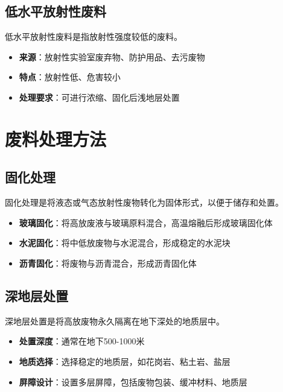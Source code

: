 \documentclass[12pt,UTF8]{ctexbook}
\begin{document}
\section{低水平放射性废料}

低水平放射性废料是指放射性强度较低的废料。

\begin{itemize}[leftmargin=2cm]
    \item \textbf{来源}：放射性实验室废弃物、防护用品、去污废物
    \item \textbf{特点}：放射性低、危害较小
    \item \textbf{处理要求}：可进行浓缩、固化后浅地层处置
\end{itemize}

\chapter{废料处理方法}

\section{固化处理}

固化处理是将液态或气态放射性废物转化为固体形式，以便于储存和处置。

\begin{itemize}[leftmargin=2cm]
    \item \textbf{玻璃固化}：将高放废液与玻璃原料混合，高温熔融后形成玻璃固化体
    \item \textbf{水泥固化}：将中低放废物与水泥混合，形成稳定的水泥块
    \item \textbf{沥青固化}：将废物与沥青混合，形成沥青固化体
\end{itemize}

\section{深地层处置}

深地层处置是将高放废物永久隔离在地下深处的地质层中。

\begin{itemize}[leftmargin=2cm]
    \item \textbf{处置深度}：通常在地下500-1000米
    \item \textbf{地质选择}：选择稳定的地质层，如花岗岩、粘土岩、盐层
    \item \textbf{屏障设计}：设置多层屏障，包括废物包装、缓冲材料、地质层
\end{itemize}
\end{document}
